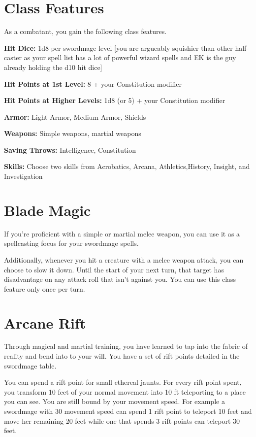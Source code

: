 \begin{multicols*}{2}



\section*{Class Features} 

As a combatant, you gain the following class features.

\textbf{Hit Dice:} 1d8 per swordmage level {\color{red} [you are argueably squishier than other half-caster as your spell list has a lot of powerful wizard spells and EK is the guy already holding the d10 hit dice]}

\textbf{Hit Points at 1st Level:} 8 + your Constitution modifier

\textbf{Hit Points at Higher Levels:} 1d8 (or 5) + your Constitution modifier


\textbf{Armor:} Light Armor, Medium Armor, Shields

\textbf{Weapons:} Simple weapons, martial weapons

\textbf{Saving Throws:} Intelligence, Constitution

\textbf{Skills:} Choose two skills from Acrobatics, Arcana, Athletics,History, Insight, and Investigation


\section*{Blade Magic}

If you’re proficient with a simple or martial melee weapon, you can use it as a spellcasting focus for your swordmage spells.

Additionally, whenever you hit a creature with a melee weapon attack,
you can choose to slow it down.
Until the start of your next turn, that target has disadvantage on any attack roll that isn't against you. You can use this class feature only once per turn.

\section*{Arcane Rift} 

Through magical and martial training, you have learned to tap into the fabric of reality and bend into to your will.
You have a set of rift points detailed in the swordmage table. 



You can spend a rift point for small ethereal jaunts. For every rift point spent, you transform 10 feet of your normal movement into 10 ft teleporting to a place you can see. You are still bound by your movement speed. For example a swordmage with 30 movement speed can spend 1 rift point to teleport 10 feet and move her remaining 20 feet while one that spends 3 rift points can teleport 30 feet.


\end{multicols*}
